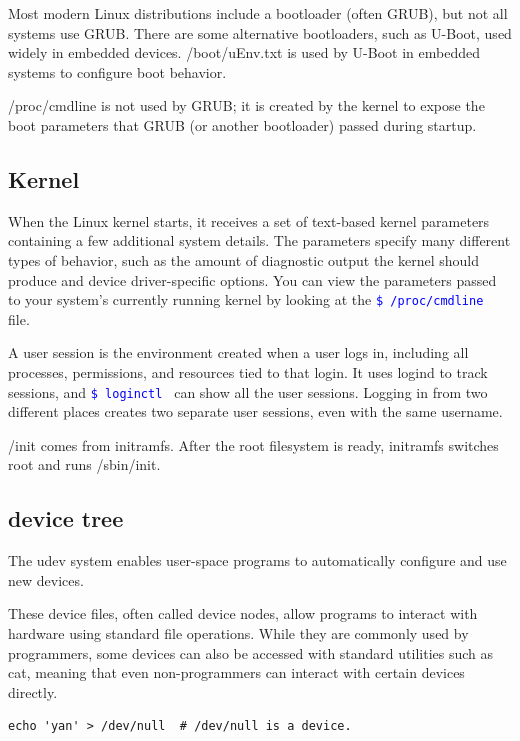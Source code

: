 \documentclass[paper=8.5in:11in, twoside, 12pt, pagesize=pdftex]{book}
\newcommand{\linuxcommand}[1]{\texttt{\textcolor{blue}{\$ #1 \Pisymbol{psy}{191}}}}
\begin{document}
	\par Most modern Linux distributions include a bootloader (often GRUB), but not all systems use GRUB. There are some alternative bootloaders, such as U-Boot, used widely in embedded devices. /boot/uEnv.txt is used by U-Boot in embedded systems to configure boot behavior.

	\par /proc/cmdline is not used by GRUB; it is created by the kernel to expose the boot parameters that GRUB (or another bootloader) passed during startup.

\subsection{Kernel}

When the Linux kernel starts, it receives a set of text-based kernel parameters containing a few additional system details. The parameters specify many different types of behavior, such as the amount of diagnostic output the kernel should produce and device driver-specific options. You can view the parameters passed to your system’s currently running kernel by looking at the \linuxcommand{/proc/cmdline} file.

	\par A user session is the environment created when a user logs in, including all processes, permissions, and resources tied to that login. It uses logind to track sessions, and \linuxcommand{loginctl} can show all the user sessions. Logging in from two different places creates two separate user sessions, even with the same username.

	\par /init comes from initramfs. After the root filesystem is ready, initramfs switches root and runs /sbin/init.


\subsection{device tree}
	The udev system enables user-space programs to automatically configure and use new devices.

	\par These device files, often called device nodes, allow programs to interact with hardware using standard file operations. While they are commonly used by programmers, some devices can also be accessed with standard utilities such as cat, meaning that even non-programmers can interact with certain devices directly.
\begin{lstlisting}
echo 'yan' > /dev/null  # /dev/null is a device.
\end{lstlisting}
\end{document}
